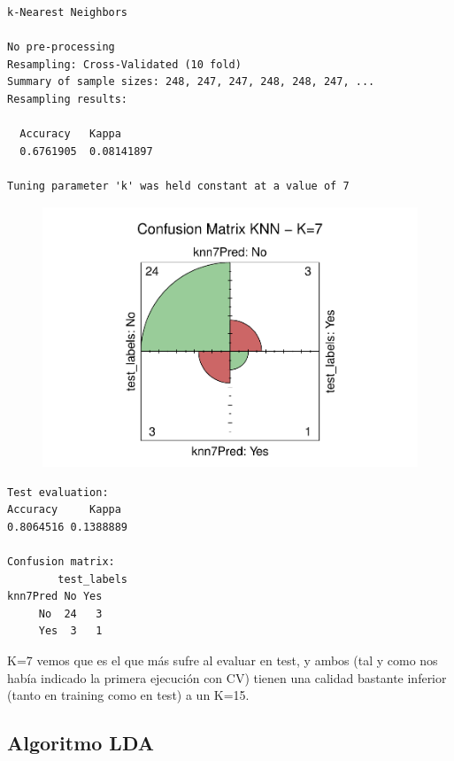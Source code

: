 \begin{verbatim}
k-Nearest Neighbors 

No pre-processing
Resampling: Cross-Validated (10 fold) 
Summary of sample sizes: 248, 247, 247, 248, 248, 247, ... 
Resampling results:

  Accuracy   Kappa     
  0.6761905  0.08141897

Tuning parameter 'k' was held constant at a value of 7
\end{verbatim}

\begin{figure}[H]\center\includegraphics[width=.9\linewidth]{img/Clasificacion_files/figure-latex/unnamed-chunk-16-1}\caption{}\end{figure}

\begin{verbatim}
Test evaluation:
Accuracy     Kappa 
0.8064516 0.1388889

Confusion matrix:
        test_labels
knn7Pred No Yes
     No  24   3
     Yes  3   1 
\end{verbatim}

K=7 vemos que es el que más sufre al evaluar en test, y ambos (tal y como nos había indicado la primera ejecución con CV) tienen una calidad bastante inferior (tanto en training como en test) a un K=15.

\subsection{Algoritmo LDA}
